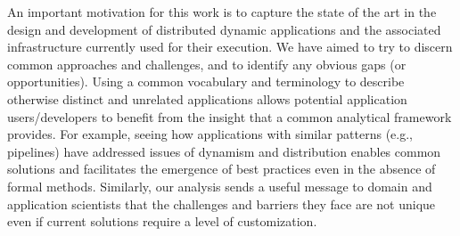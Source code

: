 An important motivation for this work is to capture the state of the
art in the design and development of distributed dynamic applications
and the associated infrastructure currently used for their
execution. We have aimed to try to discern common
approaches and challenges, and to identify any obvious gaps (or
opportunities). Using a common vocabulary and terminology
to describe otherwise distinct and unrelated applications allows
potential application
users/developers to benefit from the insight that a common
analytical framework provides. For example, seeing how
applications with similar patterns (e.g., pipelines) have addressed
issues of dynamism and distribution enables common solutions and
facilitates the emergence of best practices even in the absence of formal
methods.  Similarly, our analysis sends a useful message to domain and
application scientists that the challenges and barriers they face are not
unique even if current solutions require a level of customization.





